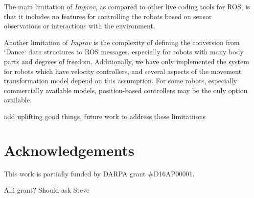 \documentclass[sigconf]{acmart}
\begin{document}
The main limitation of \emph{Improv}, as compared to other live coding tools for
ROS, is that it includes no features for controlling the robots based on sensor
observations or interactions with the environment.

Another limitation of \emph{Improv} is the complexity of defining the conversion
from `Dance` data structures to ROS messages, especially for robots with many
body parts and degrees of freedom. Additionally, we have only implemented the
system for robots which have velocity controllers, and several aspects of the
movement transformation model depend on this assumption. For some robots,
especially commercially available models, position-based controllers may be the
only option available.

{\color{red}add uplifting good things, future work to address these limitatiions}

\section{Acknowledgements}

This work is partially funded by DARPA grant \#D16AP00001.

{\color{red} Alli grant? Should ask Steve}



\end{document}

